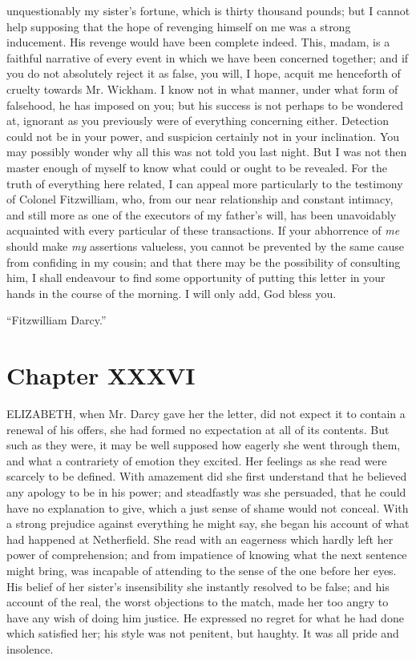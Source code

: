 \documentclass[12pt,openright]{book}
\begin{document}
unquestionably my sister’s fortune, which is thirty thousand pounds; but I cannot help supposing that the hope of revenging himself on me was a strong inducement. His revenge would have been complete indeed. This, madam, is a faithful narrative of every event in which we have been concerned together; and if you do not absolutely reject it as false, you will, I hope, acquit me henceforth of cruelty towards Mr. Wickham. I know not in what manner, under what form of falsehood, he has imposed on you; but his success is not perhaps to be wondered at, ignorant as you previously were of everything concerning either. Detection could not be in your power, and suspicion certainly not in your inclination. You may possibly wonder why all this was not told you last night. But I was not then master enough of myself to know what could or ought to be revealed. For the truth of everything here related, I can appeal more particularly to the testimony of Colonel Fitzwilliam, who, from our near relationship and constant intimacy, and still more as one of the executors of my father’s will, has been unavoidably acquainted with every particular of these transactions. If your abhorrence of \textit{me} should make \textit{my} assertions valueless, you cannot be prevented by the same cause from confiding in my cousin; and that there may be the possibility of consulting him, I shall endeavour to find some opportunity of putting this letter in your hands in the course of the morning. I will only add, God bless you.

“Fitzwilliam Darcy.”


\chapter{Chapter XXXVI}

\noindent  ELIZABETH, when Mr. Darcy gave her the letter, did not expect it to contain a renewal of his offers, she had formed no expectation at all of its contents. But such as they were, it may be well supposed how eagerly she went through them, and what a contrariety of emotion they excited. Her feelings as she read were scarcely to be defined. With amazement did she first understand that he believed any apology to be in his power; and steadfastly was she persuaded, that he could have no explanation to give, which a just sense of shame would not conceal. With a strong prejudice against everything he might say, she began his account of what had happened at Netherfield. She read with an eagerness which hardly left her power of comprehension; and from impatience of knowing what the next sentence might bring, was incapable of attending to the sense of the one before her eyes. His belief of her sister’s insensibility she instantly resolved to be false; and his account of the real, the worst objections to the match, made her too angry to have any wish of doing him justice. He expressed no regret for what he had done which satisfied her; his style was not penitent, but haughty. It was all pride and insolence.
\end{document}
